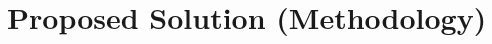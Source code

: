 \documentclass[12pt]{extarticle}
\begin{document}
\newpage

\section{Proposed Solution (Methodology)}





\end{document}
